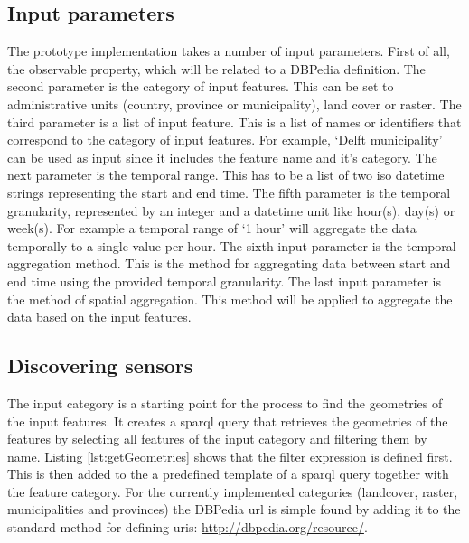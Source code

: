 \subsection{Input parameters}
The prototype implementation takes a number of input parameters. First of all, the observable property, which will be related to a DBPedia definition. The second parameter is the category of input features. This can be set to administrative units (country, province or municipality), land cover or raster. The third parameter is a list of input feature. This is a list of names or identifiers that correspond to the category of input features. For example, `Delft municipality' can be used as input since it includes the feature name and it's category. The next parameter is the temporal range. This has to be a list of two \ac{iso} datetime strings representing the start and end time. The fifth parameter is the temporal granularity, represented by an integer and a datetime unit like hour(s), day(s) or week(s). For example a temporal range of `1 hour' will aggregate the data temporally to a single value per hour. The sixth input parameter is the temporal aggregation method. This is the method for aggregating data between start and end time using the provided temporal granularity. The last input parameter is the method of spatial aggregation. This method will be applied to aggregate the data based on the input features.       

\subsection{Discovering sensors}
\label{par:discoverSensors}
The input category is a starting point for the process to find the geometries of the input features. It creates a \ac{sparql} query that retrieves the geometries of the features by selecting all features of the input category and filtering them by name. Listing \ref{lst:getGeometries} shows that the filter expression is defined first. This is then added to the a predefined template of a \ac{sparql} query together with the feature category. For the currently implemented categories (landcover, raster, municipalities and provinces) the DBPedia \ac{url} is simple found by adding it to the standard method for defining \acp{uri}: \url{http://dbpedia.org/resource/}.   

